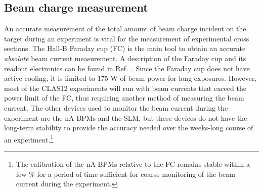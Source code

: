 



  





\subsection{Beam charge measurement}
\label{sec:FC}

An accurate measurement of the total amount of beam charge incident on the target during an experiment is vital for the measurement of 
experimental cross sections. The Hall-B Faraday cup (FC) is the main tool to obtain an accurate {\it absolute}  beam current  
measurement. A description of the Faraday cup and its readout electronics can be found in Ref.~\cite{CLAS}. 
Since the Faraday cup does not have active cooling, it is limited to 175 W of beam power for long exposures. 
However, most of the CLAS12 experiments will run with beam currents that exceed the power limit of the FC, thus requiring another method
of measuring the beam current. The other devices used to monitor the beam current during the experiment are the nA-BPMs and the SLM, 
but these devices do not have the long-term stability to provide the accuracy needed over the weeks-long course of an 
experiment.\footnote{The calibration of the nA-BPMs relative to the FC remains stable within a few \% for a period of time sufficient 
for coarse monitoring of the beam current during the experiment.}   

